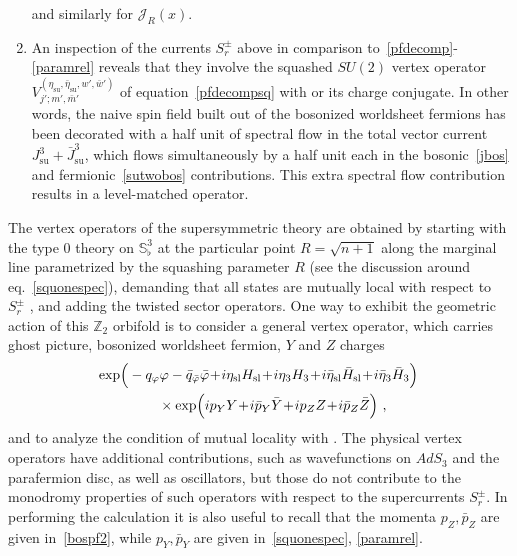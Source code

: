 \documentclass[12pt]{article}
\def\sl{\text{sl}}
\def\su{\text{su}}
\def\sutwo{{SU(2)}}
\def\sqsphere{{\bS^3_\flat}}
\def\tight#1{\! #1 \!}  %
\def\half{\frac12}
\def\coeff#1#2{{\textstyle \frac{#1}{#2}}}
\def\hf{\coeff12}
\def\nn{\nonumber}
\newcommand{\bS}{{\mathbb S}}
\newcommand{\bZ}{{\mathbb Z}}
\numberwithin{equation}{section}
\def\cG{\mathcal {G}} \def\cH{\mathcal {H}} \def\cI{\mathcal {I}}
\def\cJ{\mathcal {J}} \def\cK{\mathcal {K}} \def\cL{\mathcal {L}}
\def\coeff#1#2{{\textstyle{\frac{#1}{ #2}}}}
\def\half{\frac12}
\def\hf{{\textstyle\half}}
\def\exp{{\rm exp}}
\def\mbar{{\bar m}}
\begin{document}
\begin{enumerate}[1)]
\eqn[expandsuper]{\cG^\pm(x)=\sum_r \cG^\pm_r x^{-r-\frac32}}
and similarly for $\cJ_R(x)$.
\item An inspection of the currents $S_r^\pm$ above in comparison to~\eqref{pfdecomp}-\eqref{paramrel} reveals that they involve the squashed $\sutwo$ vertex operator $V^{(\eta_\su,\bar\eta_\su,w',\bar w')}_{j';m',\mbar'}$ of equation~\eqref{pfdecompsq} with 
\eqn[Sqnums]{
R=\sqrt{n+1}
~,~~~
j'=m'=\mbar'=0
~,~~~
\eta_\su = 1
~,~~~
\bar\eta_\su = \hf
~,~~~
w'=\bar w'=\hf ~, 
}
or its charge conjugate. In other words, the naive spin field built out of the bosonized worldsheet fermions has been decorated with a half unit of spectral flow in the total vector current $J^3_\su+\bar J^3_\su$, which flows simultaneously by a half unit each in the bosonic~\eqref{jbos} and fermionic~\eqref{sutwobos} contributions.  This extra spectral flow contribution results in a level-matched operator.
\end{enumerate}



\noindent 
The vertex operators of the supersymmetric theory are obtained by starting with the type 0 theory on $\sqsphere$ at the particular point $R=\sqrt{n+1}$ along the marginal line parametrized by the squashing parameter $R$ (see the discussion around eq.~\eqref{squonespec}), demanding that all states are mutually local with respect to $S_r^\pm$ \susyops, and adding the twisted sector operators. One way to exhibit the geometric action of this $\bZ_2$ orbifold is to consider a general vertex operator, which carries ghost picture, bosonized worldsheet fermion, $Y$ and $Z$ charges 
\begin{align}
\label{etaYZcharges}
&\exp\Big(-q_\varphi\varphi-\bar q_{\bar\varphi}\bar\varphi 
\tight+ i\eta_\sl H_\sl \tight+i\eta_3 H_3 \tight+   i\bar\eta_\sl \bar H_\sl \tight+i\bar \eta_3 \bar H_3 \Big) \,
\\
&\hskip 1.5cm
\times \exp\Big( ip_Y Y \tight+ i \bar p_Y \bar Y \tight+ ip_Z Z \tight+ i \bar p_Z \bar Z \Big)~,
\nn
\end{align}
and to analyze the condition of mutual locality with \susyops. The physical vertex operators have additional contributions, such as wavefunctions on $AdS_3$ and the parafermion disc, as well as oscillators, but those do not contribute to the monodromy properties of such operators with respect to the supercurrents $S_r^\pm$. In performing the calculation it is also useful to recall that the momenta $p_Z,\bar p_Z$ are given in~\eqref{bospf2}, while $p_Y,\bar p_Y$ are given in~\eqref{squonespec}, \eqref{paramrel}.
\end{document}
